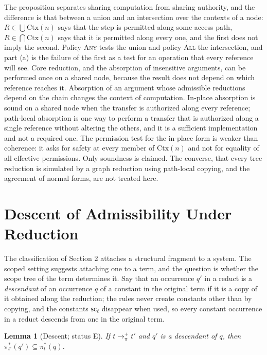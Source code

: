 \documentclass[11pt]{article}
\newtheorem{lemma}[theorem]{Lemma}
\theoremstyle{definition}
\theoremstyle{remark}
\newcommand{\sca}[1]{\mathsf{sc}_{#1}}
\newcommand{\Ctx}{\mathrm{Ctx}}
\newcommand{\Et}{status E}
\begin{document}
The proposition separates sharing computation from sharing authority, and the difference is that between a union and an intersection over the contexts of a node: $R\in\bigcup\Ctx(n)$ says that the step is permitted along some access path, $R\in\bigcap\Ctx(n)$ says that it is permitted along every one, and the first does not imply the second. Policy \textsc{Any} tests the union and policy \textsc{All} the intersection, and part (a) is the failure of the first as a test for an operation that every reference will see. Core reduction, and the absorption of insensitive arguments, can be performed once on a shared node, because the result does not depend on which reference reaches it. Absorption of an argument whose admissible reductions depend on the chain changes the context of computation. In-place absorption is sound on a shared node when the transfer is authorized along every reference; path-local absorption is one way to perform a transfer that is authorized along a single reference without altering the others, and it is a sufficient implementation and not a required one. The permission test for the in-place form is weaker than coherence: it asks for safety at every member of $\Ctx(n)$ and not for equality of all effective permissions. Only soundness is claimed. The converse, that every tree reduction is simulated by a graph reduction using path-local copying, and the agreement of normal forms, are not treated here.

\section{Descent of Admissibility Under Reduction}

The classification of Section 2 attaches a structural fragment to a system. The scoped setting suggests attaching one to a term, and the question is whether the scope tree of the term determines it. Say that an occurrence $q'$ in a reduct is a \emph{descendant} of an occurrence $q$ of a constant in the original term if it is a copy of it obtained along the reduction; the rules never create constants other than by copying, and the constants $\sca\ell$ disappear when used, so every constant occurrence in a reduct descends from one in the original term.

\begin{lemma}[Descent; \Et]\label{lem:descent}
If $t\to_\pi^{+}t'$ and $q'$ is a descendant of $q$, then $\pi^\ast_{t'}(q')\subseteq\pi^\ast_t(q)$.
\end{lemma}
\end{document}
